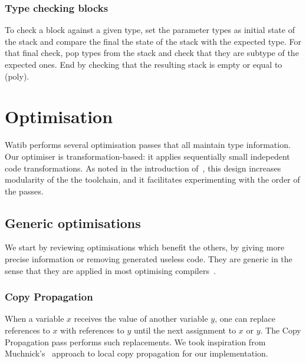 \documentclass[a4paper,11pt]{article}
\begin{document}
\subsubsection{Type checking blocks}
To check a block against a given type, set the parameter types as initial state
of the stack and compare the final the state of the stack with the expected
type. For that final check, pop types from the stack and check that they
are subtype of the expected ones. End by checking that the resulting stack is
empty or equal to \textsf{(poly)}.

\section{Optimisation}\label{opt}
\textsf{Watib} performs several optimisation passes that all maintain type
information. Our optimiser is transformation-based: it applies sequentially
small indepedent code transformations. As noted in the introduction
of~\cite{jones1998transformation}, this design increases modularity of the the
toolchain, and it facilitates experimenting with the order of the passes.


\subsection{Generic optimisations}
We start by reviewing optimisations which benefit the others, by giving more
precise information or removing generated useless code. They are generic in the
sense that they are applied in most optimising
compilers~\cite{muchnick1997advanced}.

\subsubsection{Copy Propagation}
When a variable $x$ receives the value of another variable $y$, one can replace
references to $x$ with references to $y$ until the next assignment to $x$ or
$y$. The Copy Propagation pass performs such replacements. We took inspiration
from Muchnick's~\cite[Section~12.5]{muchnick1997advanced} approach to local copy
propagation for our implementation.
\end{document}

